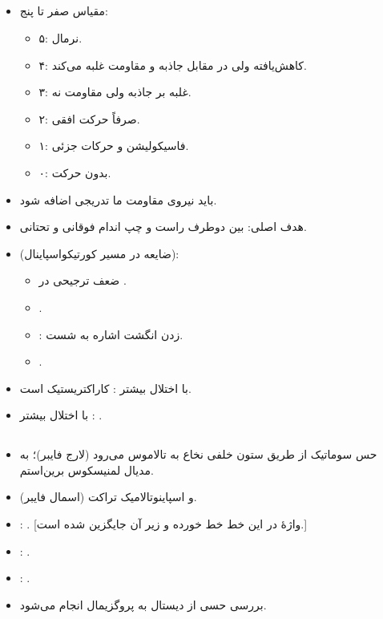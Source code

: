 \documentclass[a4paper,12pt]{extbook}
\begin{document}
\subsection*{}
\begin{itemize}
\item مقیاس صفر تا پنج:
  \begin{itemize}
  \item ۵: نرمال.
  \item ۴: کاهش‌یافته ولی در مقابل جاذبه و مقاومت غلبه می‌کند.
  \item ۳: غلبه بر جاذبه ولی مقاومت نه.
  \item ۲: صرفاً حرکت افقی.
  \item ۱: فاسیکولیشن و حرکات جزئی.
  \item ۰: بدون حرکت.
  \end{itemize}
\item باید نیروی مقاومت ما تدریجی اضافه شود.
\item هدف اصلی:  بین دوطرف راست و چپ اندام فوقانی و تحتانی.
\item {} (ضایعه در مسیر کورتیکواسپاینال):
  \begin{itemize}
  \item ضعف ترجیحی در .
  \item {}.
  \item {}: زدن انگشت اشاره به شست.
  \item {}.
  \end{itemize}
\item با اختلال بیشتر : کاراکتریستیک  است.
\item با اختلال بیشتر : .
\end{itemize}
\subsection*{}
\begin{itemize}
\item حس سوماتیک از طریق ستون خلفی نخاع به تالاموس می‌رود (لارج فایبر)؛ به مدیال لمنیسکوس برین‌استم.
\item و اسپاینوتالامیک تراکت (اسمال فایبر).
\item {}: . [واژهٔ  در این خط خط خورده و  زیر آن جایگزین شده است.]
\item {}: .
\item {}: .
\item بررسی حسی از دیستال به پروگزیمال انجام می‌شود.
\end{itemize}
\end{document}
